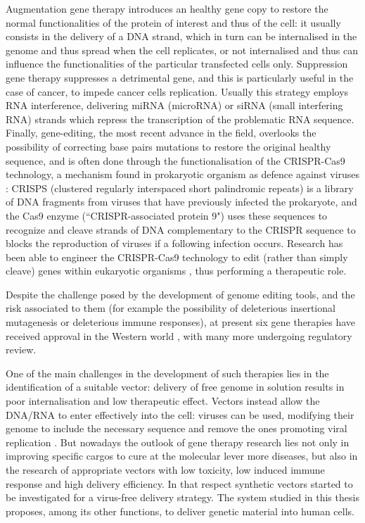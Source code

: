 Augmentation gene therapy introduces an healthy gene copy to restore the normal functionalities of the protein of interest and thus of the cell: it usually consists in the delivery of a DNA strand, which in turn can be internalised in the genome and thus spread when the cell replicates, or not internalised and thus can influence the functionalities of the particular transfected cells only.
%
Suppression gene therapy suppresses a detrimental gene, and this is particularly useful in the case of cancer, to impede cancer cells replication. Usually this strategy employs RNA interference, delivering miRNA (microRNA) or siRNA (small interfering RNA) strands which repress the transcription of the problematic RNA sequence.
%
Finally, gene-editing, the most recent advance in the field, overlooks the possibility of correcting base pairs mutations to restore the original healthy sequence, and is often done through the functionalisation of the CRISPR-Cas9 technology, a mechanism found in prokaryotic organism as defence against viruses \cite{Barrangou2015}:
%
CRISPS (clustered regularly interspaced short palindromic repeats) is a library of DNA fragments from viruses that have previously infected the prokaryote, and the Cas9 enzyme (``CRISPR-associated protein 9") uses these sequences to recognize and cleave strands of DNA complementary to the CRISPR sequence to blocks the reproduction of viruses if a following infection occurs. Research has been able to engineer the CRISPR-Cas9 technology to edit (rather than simply cleave) genes within eukaryotic organisms \cite{Zhang2014cas}, thus performing a therapeutic role.

Despite the challenge posed by the development of genome editing tools, and the risk associated to them (for example the possibility of deleterious insertional mutagenesis or deleterious immune responses), at present six gene therapies have received approval in the Western world \cite{Anguela2019}, with many more undergoing regulatory review. 

One of the main challenges in the development of such therapies lies in the identification of a suitable vector: delivery of free genome in solution results in poor internalisation and low therapeutic effect. Vectors instead allow the DNA/RNA to enter effectively into the cell: viruses can be used, modifying their genome to include the necessary sequence and remove the ones promoting viral replication \cite{Naldini2011,Mingozzi2011}.
%
But nowadays the outlook of gene therapy research lies not only in improving specific cargos to cure at the molecular lever more diseases, but also in the research of appropriate vectors with low toxicity, low induced immune response and high delivery efficiency. In that respect synthetic vectors started to be investigated for a virus-free delivery strategy. The system studied in this thesis proposes, among its other functions, to deliver genetic material into human cells.



